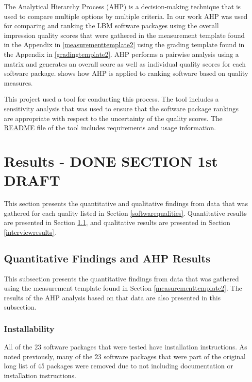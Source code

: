 \documentclass[12pt, notitlepage]{article}
\begin{document}
The Analytical Hierarchy Process (AHP) is a decision-making technique that is used to compare multiple options by multiple criteria. In our work AHP was used for comparing and ranking the LBM software packages using the overall impression quality scores that were gathered in the measurement template found in the Appendix in \ref{measurementtemplate2} using the grading template found in the Appendix in \ref{gradingtemplate2}. AHP performs a pairwise analysis using a matrix and generates an overall score as well as individual quality scores for each software package. \cite{SmithEtAl2016} shows how AHP is applied to ranking software based on quality measures. 

This project used a tool for conducting this process. The tool includes a sensitivity analysis that was used to ensure that the software package rankings are appropriate with respect to the uncertainty of the quality scores. The \href{https://github.com/smiths/AIMSS/blob/master/StateOfPractice/AHP2020/LBM/README.txt}{README} file of the tool includes requirements and usage information.

\newpage
\section{Results - DONE SECTION 1st DRAFT}\label{qualityresults}

This section presents the quantitative and qualitative findings from data that was gathered for each quality listed in Section \ref{softwarequalities}. Quantitative results are presented in Section \ref{AHPresults}, and qualitative results are presented in Section \ref{interviewresults}.

\subsection{Quantitative Findings and AHP Results}\label{AHPresults}

This subsection presents the quantitative findings from data that was gathered using the measurement template found in Section \ref{measurementtemplate2}. The results of the AHP analysis based on that data are also presented in this subsection.

\subsubsection{Installability}

All of the 23 software packages that were tested have installation instructions. As noted previously, many of the 23 software packages that were part of the original long list of 45 packages were removed due to not including documentation or installation instructions. 
\end{document}

